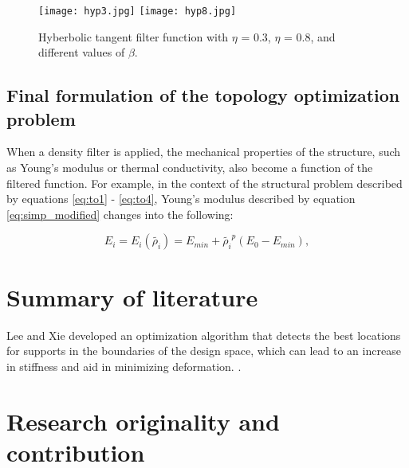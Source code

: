 \documentclass[../main.tex]{subfiles}
\begin{document}
\begin{figure}
  \texttt{[image: hyp3.jpg]} \hfill
  \texttt{[image: hyp8.jpg]} \hfill
  \caption{Hyberbolic tangent filter function with $\eta$ = 0.3, $\eta$ = 0.8, and different values of $\beta$.}
  \label{fig:tanh_filter}
\end{figure}


\subsection{Final formulation of the topology optimization problem}
When a density filter is applied, the mechanical properties of the structure, such as Young's modulus or thermal conductivity, also become a function of the filtered function. For example, in the context of the structural problem described by equations \ref{eq:to1} - \ref{eq:to4}, Young's modulus described by equation \ref{eq:simp_modified} changes into the following:


\begin{equation}
  E_i = E_i(\tilde{\rho_i}) = E_{min} + \tilde{\rho_i}^p (E_0 - E_{min}),
  \label{eq:young_filtered}
\end{equation}

\section{Summary of literature}

Lee and Xie \cite{leeSimultaneouslyOptimizingSupports2021} developed an optimization algorithm that detects the best locations for supports in the boundaries of the design space, which can lead to an increase in stiffness and aid in minimizing deformation. .


\section{Research originality and contribution}
\end{document}
